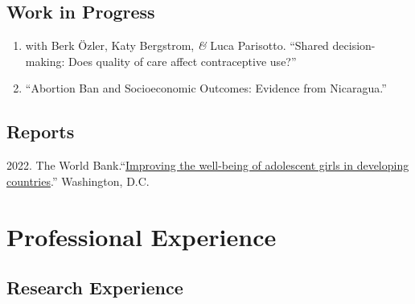 \documentclass[a4paper, 10pt]{article}
\renewenvironment{itemize}{
  \begin{list}{}
    { \setlength{\itemsep}{5pt}
      \setlength{\parsep}{0pt}
      \setlength{\topsep}{0pt}
      \setlength{\leftmargin}{0em} } }{
  \end{list}}
\begin{document}
\subsection*{Work in Progress}

\begin{enumerate}[leftmargin=10pt, label={}, itemindent=-10pt, nosep]
  \item with Berk Özler, Katy Bergstrom, \textit{\&} Luca Parisotto. ``Shared decision-making: Does quality of care affect contraceptive use?''
  \item ``Abortion Ban and Socioeconomic Outcomes: Evidence from Nicaragua.''
\end{enumerate}

\subsection*{Reports}

\begin{itemize}
  \item 2022. The World Bank.``\href{https://documents1.worldbank.org/curated/en/099025312242111019/pdf/P1699940bcc13001a083820804f74e8151b.pdf}{Improving the well-being of adolescent girls in developing countries}.'' Washington, D.C.
\end{itemize}


\section*{Professional Experience}

\subsection*{Research Experience}
\end{document}
